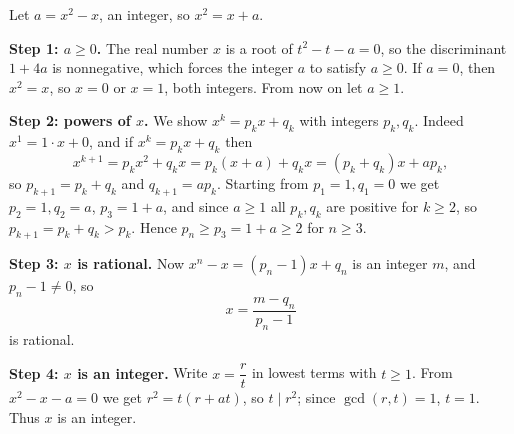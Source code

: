 Let $a=x^2-x$, an integer, so $x^2=x+a$.

\textbf{Step 1: $a\ge0$.} The real number $x$ is a root of $t^2-t-a=0$, so the discriminant $1+4a$ is nonnegative, which forces the integer $a$ to satisfy $a\ge0$. If $a=0$, then $x^2=x$, so $x=0$ or $x=1$, both integers. From now on let $a\ge1$.

\textbf{Step 2: powers of $x$.} We show $x^k=p_kx+q_k$ with integers $p_k,q_k$. Indeed $x^1=1\cdot x+0$, and if $x^k=p_kx+q_k$ then
\[
x^{k+1}=p_kx^2+q_kx=p_k(x+a)+q_kx=(p_k+q_k)x+ap_k ,
\]
so $p_{k+1}=p_k+q_k$ and $q_{k+1}=ap_k$. Starting from $p_1=1,q_1=0$ we get $p_2=1,q_2=a$, $p_3=1+a$, and since $a\ge1$ all $p_k,q_k$ are positive for $k\ge2$, so $p_{k+1}=p_k+q_k>p_k$. Hence $p_n\ge p_3=1+a\ge2$ for $n\ge3$.

\textbf{Step 3: $x$ is rational.} Now $x^n-x=(p_n-1)x+q_n$ is an integer $m$, and $p_n-1\ne0$, so
\[
x=\dfrac{m-q_n}{p_n-1}
\]
is rational.

\textbf{Step 4: $x$ is an integer.} Write $x=\dfrac{r}{t}$ in lowest terms with $t\ge1$. From $x^2-x-a=0$ we get $r^2=t(r+at)$, so $t\mid r^2$; since $\gcd(r,t)=1$, $t=1$. Thus $x$ is an integer.
